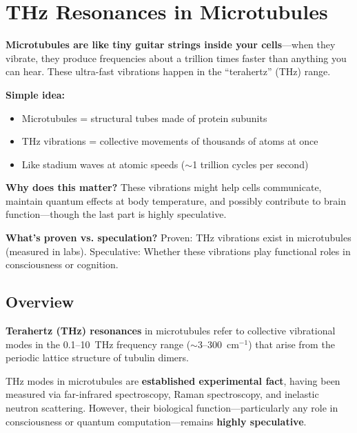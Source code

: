 \chapter{THz Resonances in Microtubules}
\label{ch:thz-resonances-microtubules}

\begin{nontechnical}
\textbf{Microtubules are like tiny guitar strings inside your cells}---when they vibrate, they produce frequencies about a trillion times faster than anything you can hear. These ultra-fast vibrations happen in the ``terahertz'' (THz) range.

\textbf{Simple idea:}
\begin{itemize}
\item Microtubules = structural tubes made of protein subunits
\item THz vibrations = collective movements of thousands of atoms at once
\item Like stadium waves at atomic speeds ($\sim$1 trillion cycles per second)
\end{itemize}

\textbf{Why does this matter?} These vibrations might help cells communicate, maintain quantum effects at body temperature, and possibly contribute to brain function---though the last part is highly speculative.

\textbf{What's proven vs. speculation?} Proven: THz vibrations exist in microtubules (measured in labs). Speculative: Whether these vibrations play functional roles in consciousness or cognition.
\end{nontechnical}

\section{Overview}
\label{sec:overview}

\textbf{Terahertz (THz) resonances} in microtubules refer to collective vibrational modes in the 0.1--10~THz frequency range ($\sim$3--300~cm$^{-1}$) that arise from the periodic lattice structure of tubulin dimers.

\begin{keyconcept}
THz modes in microtubules are \textbf{established experimental fact}, having been measured via far-infrared spectroscopy, Raman spectroscopy, and inelastic neutron scattering. However, their biological function---particularly any role in consciousness or quantum computation---remains \textbf{highly speculative}.
\end{keyconcept}

